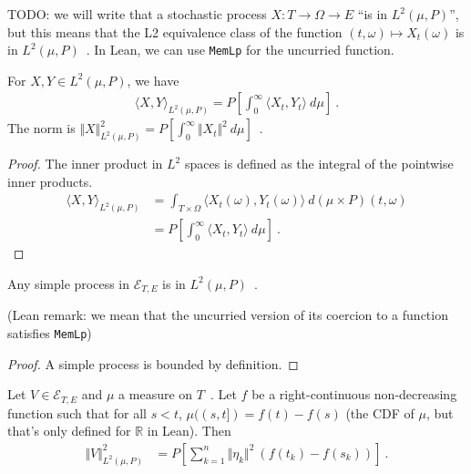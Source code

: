 TODO: we will write that a stochastic process $X : T \to \Omega \to E$ ``is in $L^2(\mu, P)$'', but this means that the L2 equivalence class of the function $(t, \omega) \mapsto X_t(\omega)$ is in $L^2(\mu, P)$~.
In Lean, we can use \texttt{MemLp} for the uncurried function.


\begin{lemma}\label{lem:L2Predictable.inner_eq}
For $X, Y \in L^2(\mu, P)$, we have
\begin{align*}
  \langle X, Y \rangle_{L^2(\mu, P)} = P\left[ \int_0^{\infty} \langle X_t, Y_t\rangle \: d\mu \right]
  \: .
\end{align*}
The norm is $\Vert X \Vert_{L^2(\mu, P)}^2 = P\left[ \int_0^{\infty} \Vert X_t \Vert^2 \: d\mu \right]$~.
\end{lemma}

\begin{proof}
The inner product in $L^2$ spaces is defined as the integral of the pointwise inner products.
\begin{align*}
  \langle X, Y \rangle_{L^2(\mu, P)}
  &= \int_{T \times \Omega} \langle X_t(\omega), Y_t(\omega) \rangle \: d(\mu \times P)(t, \omega)
  \\
  &= P\left[ \int_0^{\infty} \langle X_t, Y_t\rangle \: d\mu \right]
  \: .
\end{align*}
\end{proof}


\begin{lemma}\label{lem:simpleProcess_mem_L2Predictable}
Any simple process in $\mathcal{E}_{T, E}$ is in $L^2(\mu, P)$~.

(Lean remark: we mean that the uncurried version of its coercion to a function satisfies \texttt{MemLp})
\end{lemma}

\begin{proof}
A simple process is bounded by definition.
\end{proof}


\begin{lemma}\label{lem:L2Predictable.sq_norm_simpleProcess}
Let $V \in \mathcal{E}_{T, E}$ and $\mu$ a measure on $T$~.
Let $f$ be a right-continuous non-decreasing function such that for all $s < t$, $\mu((s,t]) = f(t) - f(s)$ (the CDF of $\mu$, but that's only defined for $\mathbb{R}$ in Lean).
Then
\begin{align*}
  \Vert V \Vert^2_{L^2(\mu, P)}
  &= P\left[ \sum_{k=1}^n \Vert \eta_k \Vert^2 \: (f(t_k) - f(s_k)) \right]
  \: .
\end{align*}
\end{lemma}

